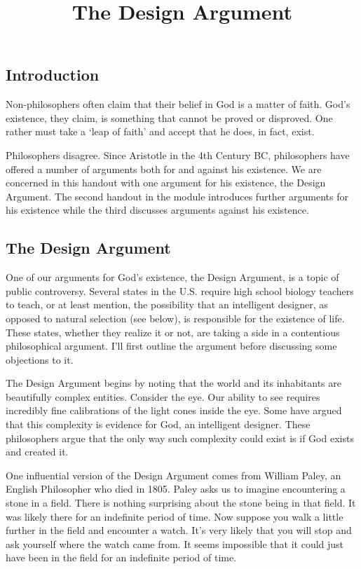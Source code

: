 \documentclass[]{article}
\title{The Design Argument}
\date{}
\begin{document}
\maketitle

\subsection{Introduction}\label{introduction}

Non-philosophers often claim that their belief in God is a matter of
faith. God's existence, they claim, is something that cannot be proved
or disproved. One rather must take a `leap of faith' and accept that he
does, in fact, exist.

Philosophers disagree. Since Aristotle in the 4th Century BC,
philosophers have offered a number of arguments both for and against his
existence. We are concerned in this handout with one argument for his
existence, the Design Argument. The second handout in the module
introduces further arguments for his existence while the third discusses
arguments against his existence.

\subsection{The Design Argument}\label{the-design-argument}

One of our arguments for God's existence, the Design Argument, is a
topic of public controversy. Several states in the U.S. require high
school biology teachers to teach, or at least mention, the possibility
that an intelligent designer, as opposed to natural selection (see
below), is responsible for the existence of life. These states, whether
they realize it or not, are taking a side in a contentious philosophical
argument. I'll first outline the argument before discussing some
objections to it.

The Design Argument begins by noting that the world and its inhabitants
are beautifully complex entities. Consider the eye. Our ability to see
requires incredibly fine calibrations of the light cones inside the eye.
Some have argued that this complexity is evidence for God, an
intelligent designer. These philosophers argue that the only way such
complexity could exist is if God exists and created it.

One influential version of the Design Argument comes from William Paley,
an English Philosopher who died in 1805. Paley asks us to imagine
encountering a stone in a field. There is nothing surprising about the
stone being in that field. It was likely there for an indefinite period
of time. Now suppose you walk a little further in the field and
encounter a watch. It's very likely that you will stop and ask yourself
where the watch came from. It seems impossible that it could just have
been in the field for an indefinite period of time.
\end{document}
